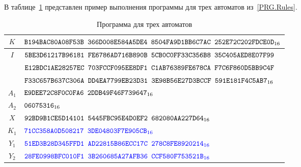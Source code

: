 \label{TEST.Prg3}

В таблице~\ref{Table.TEST.Prg3} представлен пример выполнения 
программы для трех автоматов из~\ref{PRG.Rules}.

\begin{table}[H]
\caption{Программа для трех автоматов}\label{Table.TEST.Prg3}
\begin{tabular}{|c|l|}
\hline
$K$ &
$\texttt{B194BAC80A08F53B~366D008E584A5DE4~8504FA9D1BB6C7AC~252E72C202FDCE0D}_{16}$\\
\hline
$I$ &
$\texttt{5BE3D61217B96181~FE6786AD716B890B~5CB0C0FF33C356B8~35C405AED8E07F99}$\\
&
$\texttt{E12BDC1AE28257EC~703FCCF095EE8DF1~C1AB76389FE678CA~F7C6F860D5BB9C4F}$\\
&
$\texttt{F33C657B637C306A~DD4EA7799EB23D31~3E98B56E27D3BCCF~591E181F4C5AB7}_{16}$\\
\hline
$A_1$ 
&
$\texttt{E9DEE72C8F0C0FA6~2DDB49F46F739647}_{16}$\\
\hline
$A_2$ 
&
$\texttt{06075316}_{16}$\\
\hline
$X$ 
&
$\texttt{92BD9B1CE5D14101~5445FBC95E4D0EF2~682080AA227D64}_{16}$\\
\hline
\hline
$K_1$ 
&
$\textcolor{blue}{\texttt{71CC358A0D508217~3DE04803F7E905CB}_{16}}$\\
\hline
$Y_1$ 
&
$\textcolor{blue}{\texttt{51ED3B28D345FFD1~AD22815B86ECC17C~278C8FE8920214}_{16}}$\\
\hline
$Y_2$ 
&
$\textcolor{blue}{\texttt{28FE0998BFC010F1~3B260685A27AFB36~CCF580F753521B}_{16}}$\\
\hline
\end{tabular}
\end{table}

